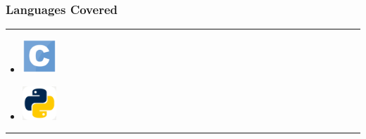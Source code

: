\documentclass[14pt]{beamer}
\begin{document}
\begin{frame}
    \frametitle{Languages Covered}
    \noindent
     {\color{pink} \rule{\linewidth}{1mm} }
    \begin{itemize}
        \item [] \includegraphics[width=0.5in, height=0.5in]{./logos/c.png}\hspace{1cm}{\huge C} \\
            \pause
        \item [] \includegraphics[width=0.5in, height=0.5in]{./logos/python.png}\hspace{1cm}{\huge Python} \\
    \end{itemize}
\noindent
    {\color{pink} \rule{\linewidth}{1mm} }
\end{frame}

   
\end{document}
